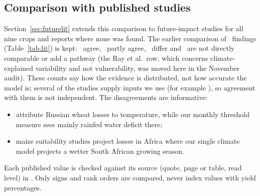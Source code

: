 \subsection{Comparison with published studies}
Section~\ref{sec:futurelit} extends this comparison to future-impact studies for all nine crops and reports where
none was found. The earlier comparison of \litN\ findings (Table~\ref{tab:lit}) is kept: \litAgree\ agree,
\litPartial\ partly agree, \litDiffer\ differ and \litOther\ are not directly comparable or add a pathway (the Ray et
al.\ row, which concerns climate-explained variability and not vulnerability, was moved here in the November audit).
These counts say how the evidence is distributed, not how accurate
the model is; several of the studies supply inputs we use (for example \citealp{deryng2014}), so agreement with them is
not independent. The disagreements are informative:
\begin{itemize}
\item \citet{lobell2011} attribute Russian wheat losses to temperature, while our monthly threshold measure sees
mainly rainfed water deficit there;
\item maize suitability studies \citep{ramirez2017} project losses in Africa where our single climate model projects
a wetter South African growing season.
\end{itemize}
Each published value is checked against its source (quote, page or table, read level) in
. Only signs and rank orders are compared, never index values with
yield percentages.

\begin{table}[p]\centering\scriptsize
\caption{Our results next to published findings (verdicts computed from our result tables by
).}\label{tab:lit}

\end{table}
